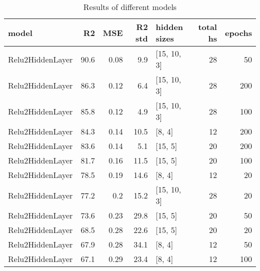 
    \begin{table*}
        \centering
        \begin{tabular}{lrrrlrr}
\hline
 model            &   R2 &   MSE &   R2 std & hidden sizes   &   total hs &   epochs \\
\hline
 Relu2HiddenLayer & 90.6 &  0.08 &      9.9 & [15, 10, 3]    &         28 &       50 \\
 Relu2HiddenLayer & 86.3 &  0.12 &      6.4 & [15, 10, 3]    &         28 &      200 \\
 Relu2HiddenLayer & 85.8 &  0.12 &      4.9 & [15, 10, 3]    &         28 &      100 \\
 Relu2HiddenLayer & 84.3 &  0.14 &     10.5 & [8, 4]         &         12 &      200 \\
 Relu2HiddenLayer & 83.6 &  0.14 &      5.1 & [15, 5]        &         20 &      200 \\
 Relu2HiddenLayer & 81.7 &  0.16 &     11.5 & [15, 5]        &         20 &      100 \\
 Relu2HiddenLayer & 78.5 &  0.19 &     14.6 & [8, 4]         &         12 &       20 \\
 Relu2HiddenLayer & 77.2 &  0.2  &     15.2 & [15, 10, 3]    &         28 &       20 \\
 Relu2HiddenLayer & 73.6 &  0.23 &     29.8 & [15, 5]        &         20 &       50 \\
 Relu2HiddenLayer & 68.5 &  0.28 &     22.6 & [15, 5]        &         20 &       20 \\
 Relu2HiddenLayer & 67.9 &  0.28 &     34.1 & [8, 4]         &         12 &       50 \\
 Relu2HiddenLayer & 67.1 &  0.29 &     23.4 & [8, 4]         &         12 &      100 \\
\hline
\end{tabular}
        \caption{Results of different models}
        \label{models}
    \end{table*}
    

